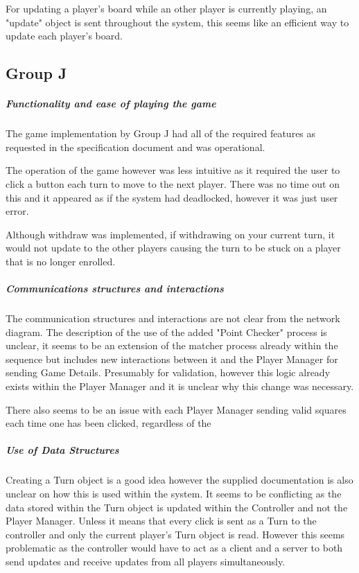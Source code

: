 \documentclass[10pt, a4paper]{article}
\begin{document}
	For updating a player's board while an other player is currently playing, an "update" object is sent throughout the system, this seems like an efficient way to update each player's board.
	
	\subsection{Group J}
	
	\subparagraph{Functionality and ease of playing the game}
	
	The game implementation by Group J had all of the required features as requested in the specification document and was operational.
	
	The operation of the game however was less intuitive as it required the user to click a button each turn to move to the next player. There was no time out on this and it appeared as if the system had deadlocked, however it was just user error.
	
	Although withdraw was implemented, if withdrawing on your current turn, it would not update to the other players causing the turn to be stuck on a player that is no longer enrolled.
	
	\subparagraph{Communications structures and interactions}

	The communication structures and interactions are not clear from the network diagram. 
	The description of the use of the added "Point Checker" process is unclear, it seems to be an extension of the matcher process already within the sequence but includes new interactions between it and the Player Manager for sending Game Details. Presumably for validation, however this logic already exists within the Player Manager and it is unclear why this change was necessary.
	
	There also seems to be an issue with each Player Manager sending valid squares each time one has been clicked, regardless of the 
	
	\subparagraph{Use of Data Structures}

	Creating a Turn object is a good idea however the supplied documentation is also unclear on how this is used within the system. It seems to be conflicting as the data stored within the Turn object is updated within the Controller and not the Player Manager. Unless it means that every click is sent as a Turn to the controller and only the current player's Turn object is read. However this seems problematic as the controller would have to act as a client and a server to both send updates and receive updates from all players simultaneously.
	
\end{document}
